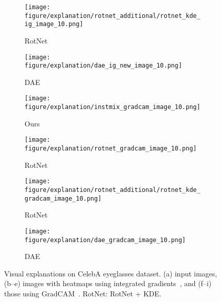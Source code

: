 \documentclass{article} \usepackage{iclr2021_conference,times}
\begin{document}
\begin{figure}[h!]
\hspace{-2mm}
\begin{subfigure}{.11\textwidth}
  \centering
  \texttt{[image: figure/explanation/rotnet\_additional/rotnet\_kde\_ig\_image\_10.png]}
  \caption{RotNet}
\end{subfigure}
\hspace{-2mm}
\begin{subfigure}{.11\textwidth}
  \centering
  \texttt{[image: figure/explanation/dae\_ig\_new\_image\_10.png]}
  \caption{DAE}
\end{subfigure}
\hspace{-2mm}
\begin{subfigure}{.11\textwidth}
  \centering
  \texttt{[image: figure/explanation/instmix\_gradcam\_image\_10.png]}
  \caption{Ours}
\end{subfigure}
\hspace{-2mm}
\begin{subfigure}{.11\textwidth}
  \centering
  \texttt{[image: figure/explanation/rotnet\_gradcam\_image\_10.png]}
  \caption{RotNet}
\end{subfigure}
\hspace{-2mm}
\begin{subfigure}{.11\textwidth}
  \centering
  \texttt{[image: figure/explanation/rotnet\_additional/rotnet\_kde\_gradcam\_image\_10.png]}
  \caption{RotNet}
\end{subfigure}
\hspace{-2mm}
\begin{subfigure}{.11\textwidth}
  \centering
  \texttt{[image: figure/explanation/dae\_gradcam\_image\_10.png]}
  \caption{DAE}
\end{subfigure}
\caption{Visual explanations on CelebA eyeglasses dataset. (a) input images, (b--e) images with heatmaps using integrated gradients~\citep{sundararajan2017axiomatic}, and (f--i) those using GradCAM~\citep{selvaraju2017grad}. RotNet: RotNet + KDE.}
\label{fig:visual_explanation_celeba_2}
\end{figure}
\end{document}
